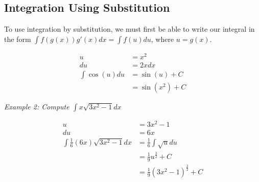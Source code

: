 \documentclass{article}
\begin{document}
        \subsection{Integration Using Substitution}
            To use integration by substitution, we must first be able to write our integral in the
            form $\int f(g(x))g'(x)dx=\int f(u)du$, where $u=g(x)$. \\

            \noindent \color{blue}  \color{black}

            \begin{align*}
                u                   &= x^2 \\
                du                  &= 2xdx \\
                \int \cos{(u)}du    &= \sin{(u)}+C \\
                                    &= \sin{(x^2)} + C
            \end{align*}

            \noindent \color{blue} \textit{Example 2: Compute $\int x\sqrt{3x^2-1}dx$} \color{black}

            \begin{align*}
                u                                   &= 3x^2-1 \\
                du                                  &= 6x \\
                \int \frac{1}{6}(6x)\sqrt{3x^2-1}dx &= \frac{1}{6}\int\sqrt{u}du \\
                                                    &= \frac{1}{9}u^{\frac{3}{2}}+C \\
                                                    &= \frac{1}{9}(3x^2-1)^{\frac{3}{2}} + C
            \end{align*}


        \noindent \color{blue}  \color{black}
\end{document}
